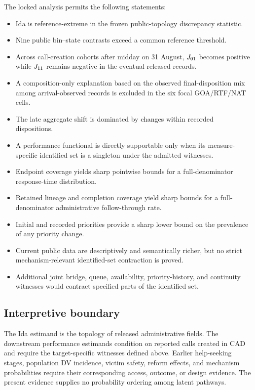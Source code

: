 \documentclass[11pt]{article}
\begin{document}
The locked analysis permits the following statements:
\begin{itemize}
\item Ida is reference-extreme in the frozen public-topology discrepancy statistic.
\item Nine public bin--state contrasts exceed a common reference threshold.
\item Across call-creation cohorts after midday on 31 August, $J_{01}$ becomes positive while $J_{11}$ remains negative in the eventual released records.
\item A composition-only explanation based on the observed final-disposition mix among arrival-observed records is excluded in the six focal GOA/RTF/NAT cells.
\item The late aggregate shift is dominated by changes within recorded dispositions.
\item A performance functional is directly supportable only when its measure-specific identified set is a singleton under the admitted witnesses.
\item Endpoint coverage yields sharp pointwise bounds for a full-denominator response-time distribution.
\item Retained lineage and completion coverage yield sharp bounds for a full-denominator administrative follow-through rate.
\item Initial and recorded priorities provide a sharp lower bound on the prevalence of any priority change.
\item Current public data are descriptively and semantically richer, but no strict mechanism-relevant identified-set contraction is proved.
\item Additional joint bridge, queue, availability, priority-history, and continuity witnesses would contract specified parts of the identified set.
\end{itemize}

\subsection{Interpretive boundary}

The Ida estimand is the topology of released administrative fields. The downstream performance estimands condition on reported calls created in CAD and require the target-specific witnesses defined above. Earlier help-seeking stages, population DV incidence, victim safety, reform effects, and mechanism probabilities require their corresponding access, outcome, or design evidence. The present evidence supplies no probability ordering among latent pathways.
\end{document}
